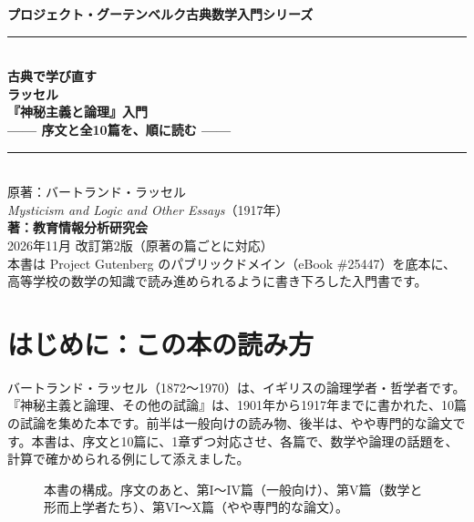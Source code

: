 \documentclass[a4paper,11pt,openany]{ltjsbook}
\begin{document}
\begin{titlepage}
\begin{center}
\vspace*{1.5cm}
{\Large\bfseries プロジェクト・グーテンベルク古典数学入門シリーズ}\\[0.8cm]
\rule{\textwidth}{1.5pt}\\[0.4cm]
{\Huge\bfseries 古典で学び直す\\ラッセル\\『神秘主義と論理』入門}\\[0.4cm]
{\Large\bfseries —— 序文と全10篇を、順に読む ——}\\[0.4cm]
\rule{\textwidth}{1.5pt}\\[1.5cm]
{\large 原著：バートランド・ラッセル\\
\textit{Mysticism and Logic and Other Essays}（1917年）}\\[2.0cm]
{\Large\bfseries 著：教育情報分析研究会}\\[2.5cm]
\vfill
{\large 2026年11月 改訂第2版（原著の篇ごとに対応）}\\[0.5cm]
{\footnotesize 本書は Project Gutenberg のパブリックドメイン（eBook \#25447）を底本に、\\
高等学校の数学の知識で読み進められるように書き下ろした入門書です。}
\end{center}
\end{titlepage}

\frontmatter
\tableofcontents
\mainmatter

\chapter*{はじめに：この本の読み方}

バートランド・ラッセル（1872〜1970）は、イギリスの論理学者・哲学者です。『神秘主義と論理、その他の試論』は、1901年から1917年までに書かれた、10篇の試論を集めた本です。前半は一般向けの読み物、後半は、やや専門的な論文です。本書は、序文と10篇に、1章ずつ対応させ、各篇で、数学や論理の話題を、計算で確かめられる例にして添えました。

\begin{figure}[htbp]
\centering
{}
\caption{本書の構成。序文のあと、第I〜IV篇（一般向け）、第V篇（数学と形而上学者たち）、第VI〜X篇（やや専門的な論文）。}
\end{figure}
\end{document}
